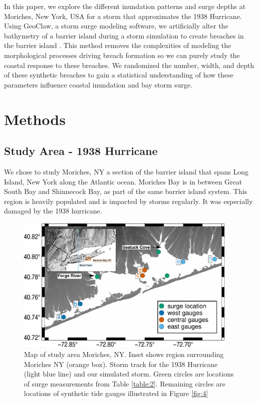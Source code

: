 \documentclass{coastal_paper}
\begin{document}
In this paper, we explore the different inundation patterns and surge depths at Moriches, New York, USA for a storm that approximates the 1938 Hurricane. Using GeoClaw, a storm surge modeling software, we artificially alter the bathymetry of a barrier island during a storm simulation to create breaches in the barrier island \citep{mandli2016clawpack}. This method removes the complexities of modeling the morphological processes driving breach formation so we can purely study the coastal response to these breaches. We randomized the number, width, and depth of these synthetic breaches to gain a statistical understanding of how these parameters influence coastal inundation and bay storm surge. 

\section{Methods}
\subsection{Study Area - 1938 Hurricane}
We chose to study Moriches, NY a section of the barrier island that spans Long Island, New York along the Atlantic ocean. Moriches Bay is in between Great South Bay and Shinnecock Bay, as part of the same barrier island system. This region is heavily populated and is impacted by storms regularly. It was especially damaged by the 1938 hurricane. 

\begin{figure}
    \centering
    \includegraphics[width=0.95\textwidth]{figures/fig2_v2.pdf}
    \caption{Map of study area Moriches, NY. Inset shows region surrounding Moriches NY (orange box). Storm track for the 1938 Hurricane (light blue line) and our simulated storm. Green circles are locations of surge measurements from Table \ref{table:2}. Remaining circles are locations of synthetic tide gauges illustrated in Figure \ref{fig:4}}
    \label{fig:1}
\end{figure}
\end{document}
